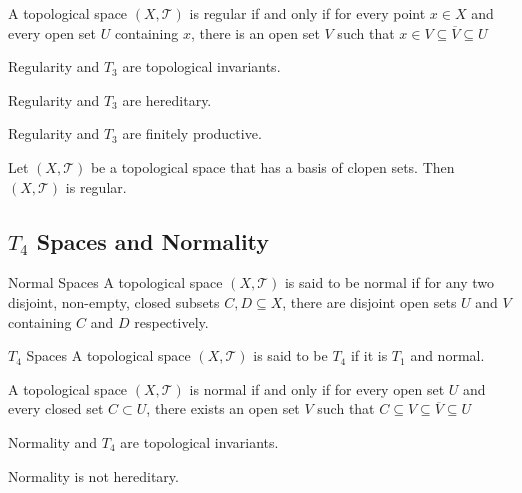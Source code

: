 \documentclass[a4paper]{article}
\begin{document}
\begin{prp}{}{} A topological space $(X,\mathcal{T})$ is regular if and only if for every point $x\in X$ and every open set $U$ containing $x$, there is an open set $V$ such that $x\in V\subseteq\overline{V}\subseteq U$
\end{prp}

\begin{prp}{}{} Regularity and $T_3$ are topological invariants. 
\end{prp}

\begin{prp}{}{} Regularity and $T_3$ are hereditary. 
\end{prp}

\begin{prp}{}{} Regularity and $T_3$ are finitely productive. 
\end{prp}

\begin{prp}{}{} Let $(X,\mathcal{T})$ be a topological space that has a basis of clopen sets. Then $(X,\mathcal{T})$ is regular. 
\end{prp}

\subsection{$T_4$ Spaces and Normality}
\begin{defn}{Normal Spaces}{} A topological space $(X,\mathcal{T})$ is said to be normal if for any two disjoint, non-empty, closed subsets $C,D\subseteq X$, there are disjoint open sets $U$ and $V$ containing $C$ and $D$ respectively. 
\end{defn}

\begin{defn}{$T_4$ Spaces}{} A topological space $(X,\mathcal{T})$ is said to be $T_4$ if it is $T_1$ and normal. 
\end{defn}

\begin{prp}{}{}  A topological space $(X,\mathcal{T})$ is normal if and only if for every open set $U$ and every closed set $C\subset U$, there exists an open set $V$ such that $C\subseteq V\subseteq\overline{V}\subseteq U$
\end{prp}

\begin{prp}{}{} Normality and $T_4$ are topological invariants. 
\end{prp}

\begin{prp}{}{} Normality is not hereditary. 
\end{prp}
\end{document}
